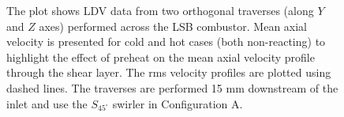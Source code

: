\begin{figure}[h]

\centering



\caption[Effect of preheat temperature on the LSB flow field - II]{The plot shows LDV data from two orthogonal traverses (along \(Y\) and \(Z\) axes) performed across the LSB combustor. Mean axial velocity is presented for cold and hot cases (both non-reacting) to highlight the effect of preheat on the mean axial velocity profile through the shear layer. The rms velocity profiles are plotted using dashed lines. The traverses are performed 15 mm downstream of the inlet and use the \(S_{45^\circ}\) swirler in Configuration A.}

\label{fig:temperatureLDVTransverse}

\end{figure}

